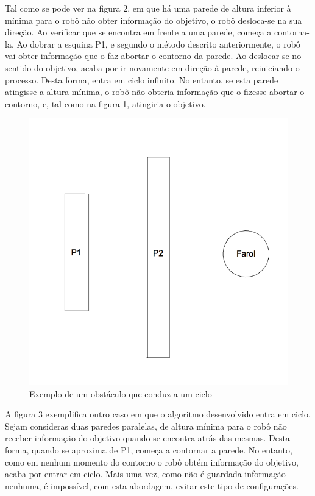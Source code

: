 \documentclass[citeauthoryear]{llncs} %
\begin{document}
Tal como se pode ver na figura 2, em que há uma parede de altura inferior à mínima para o robô não obter informação do objetivo, o robô desloca-se na sua direção. Ao verificar que se encontra em frente a uma parede, começa a contorna-la. Ao dobrar a esquina P1, e segundo o método descrito anteriormente, o robô vai obter informação que o faz abortar o contorno da parede. Ao deslocar-se no sentido do objetivo, acaba por ir novamente em direção à parede, reiniciando o processo. Desta forma, entra em ciclo infinito. No entanto, se esta parede atingisse a altura mínima, o robô não obteria informação que o fizesse abortar o contorno, e, tal como na figura 1, atingiria o objetivo.   

\begin{figure}[htb]
\begin{center}
\includegraphics[scale=0.20]{fig3.png}
\caption{Exemplo de um obstáculo que conduz a um ciclo}
\end{center}
\end{figure}

A figura 3 exemplifica outro caso em que o algoritmo desenvolvido entra em ciclo. Sejam consideras duas paredes paralelas, de altura mínima para o robô não receber informação do objetivo quando se encontra atrás das mesmas. Desta forma, quando se aproxima de P1, começa a contornar a parede. No entanto, como em nenhum momento do contorno o robô obtém informação do objetivo, acaba por entrar em ciclo. Mais uma vez, como não é guardada informação nenhuma, é impossível, com esta abordagem, evitar este tipo de configurações.
\end{document}
